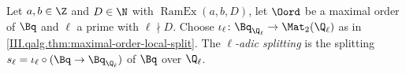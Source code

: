 Let $a,b\in\Z$ and $D\in\N$ with $\operatorname{RamEx}(a,b,D)$, let $\Oord$ be a maximal order of $\Bq$ and $\ell$ a prime with
$\ell\nmid D$. Choose $\iota_\ell\colon\Bq_{\Q_\ell}\to\Mat_2(\Q_\ell)$ as in \cref{III.qalg.thm:maximal-order-local-split}. The
\emph{$\ell$-adic splitting} is the splitting $s_\ell=\iota_\ell\circ(\Bq\to\Bq_{\Q_\ell})$ of $\Bq$ over $\Q_\ell$.
